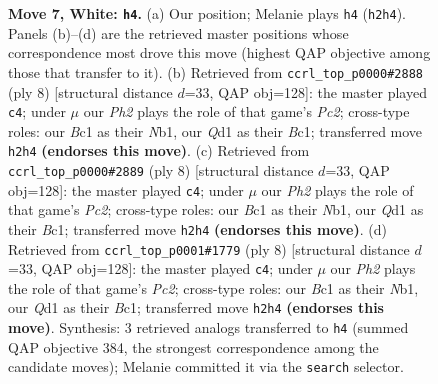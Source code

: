 \documentclass[11pt]{article}
\begin{document}
\begin{figure}[p]
\caption{\textbf{Move 7, White: \texttt{h4}.} (a) Our position; Melanie plays \texttt{h4} (\texttt{h2h4}). Panels (b)--(d) are the retrieved master positions whose correspondence most drove this move (highest QAP objective among those that transfer to it). (b) Retrieved from \texttt{ccrl\_top\_p0000\#2888} (ply 8) [structural distance $d$=33, QAP obj=128]: the master played \texttt{c4}; under $\mu$ our \emph{Ph2} plays the role of that game's \emph{Pc2}; cross-type roles: our \emph{B}c1 as their \emph{N}b1, our \emph{Q}d1 as their \emph{B}c1; transferred move \texttt{h2h4} \textbf{(endorses this move)}. (c) Retrieved from \texttt{ccrl\_top\_p0000\#2889} (ply 8) [structural distance $d$=33, QAP obj=128]: the master played \texttt{c4}; under $\mu$ our \emph{Ph2} plays the role of that game's \emph{Pc2}; cross-type roles: our \emph{B}c1 as their \emph{N}b1, our \emph{Q}d1 as their \emph{B}c1; transferred move \texttt{h2h4} \textbf{(endorses this move)}. (d) Retrieved from \texttt{ccrl\_top\_p0001\#1779} (ply 8) [structural distance $d$=33, QAP obj=128]: the master played \texttt{c4}; under $\mu$ our \emph{Ph2} plays the role of that game's \emph{Pc2}; cross-type roles: our \emph{B}c1 as their \emph{N}b1, our \emph{Q}d1 as their \emph{B}c1; transferred move \texttt{h2h4} \textbf{(endorses this move)}. Synthesis: 3 retrieved analogs transferred to \texttt{h4} (summed QAP objective 384, the strongest correspondence among the candidate moves); Melanie committed it via the \texttt{search} selector.}
\label{fig:thought-m12}
\end{figure}

\clearpage
\end{document}
